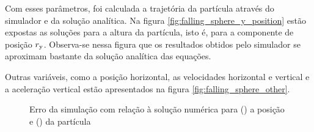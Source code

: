 Com esses parâmetros, foi calculada a trajetória da partícula através do simulador e da solução analítica. Na figura \ref{fig:falling_sphere_y_position} estão expostas as soluções para a altura da partícula, isto é, para a componente de posição \({r}_{\text{y}}\). Observa-se nessa figura que os resultados obtidos pelo simulador se aproximam bastante da solução analítica das equações.

Outras variáveis, como a posição horizontal, as velocidades horizontal e vertical e a aceleração vertical estão apresentados na figura \ref{fig:falling_sphere_other}.

\begin{figure}[h]
	\caption{Erro da simulação com relação à solução numérica para () a posição e () da partícula}
	\centering
	\captionsetup[subfloat]{labelfont=bf}
\end{figure}
